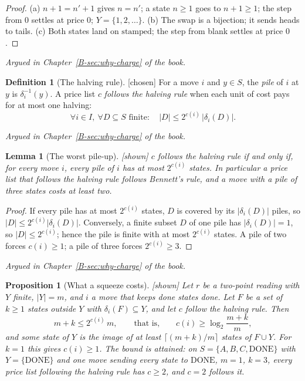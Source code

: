 \documentclass[11pt, a4paper]{article}
\theoremstyle{plain}
\newtheorem{proposition}[theorem]{Proposition}
\newtheorem{lemma}[theorem]{Lemma}
\theoremstyle{definition}
\newtheorem{definition}[theorem]{Definition}
\theoremstyle{remark}
\newcommand{\step}{\delta}
\newcommand{\cost}{c}
\newcommand{\rd}{r}
\newcommand{\inv}{^{-1}}
\newcommand{\argued}[1]{\par\noindent\textit{Argued in Chapter~\ref{B-#1} of the book.}\par}
\newcommand{\kind}[1]{\textup{[#1]}}
\begin{document}
\begin{proof}
(a) $n+1=n'+1$ gives $n=n'$; a state $n\ge1$ goes to $n+1\ge1$; the step from $0$ settles at price $0$;
$Y=\{1,2,\dots\}$. (b) The swap is a bijection; it sends heads to tails. (c) Both states land on
$\mathrm{stamped}$; the step from blank settles at price $0$.
\end{proof}

\argued{sec:why-charge}

\begin{definition}[The halving rule]\label{spec:halving} \kind{chosen}
For a move $i$ and $y\in S$, the \emph{pile} of $i$ at $y$ is $\step_i\inv(y)$. A price list $\cost$
\emph{follows the halving rule} when each unit of cost pays for at most one halving:
\[
\forall i\in I,\ \forall D\subseteq S \text{ finite}:\quad |D|\le 2^{\cost(i)}\,|\step_i(D)| .
\]
\end{definition}

\argued{sec:why-charge}

\begin{lemma}[The worst pile-up]\label{spec:worst-pile} \kind{shown}
$\cost$ follows the halving rule if and only if, for every move $i$, every pile of $i$ has at most
$2^{\cost(i)}$ states. In particular a price list that follows the halving rule follows Bennett's rule,
and a move with a pile of three states costs at least two.
\end{lemma}

\begin{proof}
If every pile has at most $2^{\cost(i)}$ states, $D$ is covered by its $|\step_i(D)|$ piles, so
$|D|\le2^{\cost(i)}|\step_i(D)|$. Conversely, a finite subset $D$ of one pile has $|\step_i(D)|=1$, so
$|D|\le2^{\cost(i)}$; hence the pile is finite with at most $2^{\cost(i)}$ states. A pile of two forces
$\cost(i)\ge1$; a pile of three forces $2^{\cost(i)}\ge3$.
\end{proof}

\argued{sec:why-charge}

\begin{proposition}[What a squeeze costs]\label{spec:squeeze} \kind{shown}
Let $\rd$ be a two-point reading with $Y$ finite, $|Y|=m$, and $i$ a move that keeps done states done.
Let $F$ be a set of $k\ge1$ states outside $Y$ with $\step_i(F)\subseteq Y$, and let $\cost$ follow the
halving rule. Then
\[
m+k\le 2^{\cost(i)}\,m,\qquad\text{that is,}\qquad \cost(i)\ge\log_2\frac{m+k}{m},
\]
and some state of $Y$ is the image of at least $\lceil (m+k)/m\rceil$ states of $F\cup Y$. For $k=1$ this gives
$\cost(i)\ge1$. The bound is attained: on $S=\{A,B,C,\mathrm{DONE}\}$ with $Y=\{\mathrm{DONE}\}$ and one
move sending every state to $\mathrm{DONE}$, $m=1$, $k=3$, every price list following the halving rule
has $\cost\ge2$, and $\cost=2$ follows it.
\end{proposition}
\end{document}
